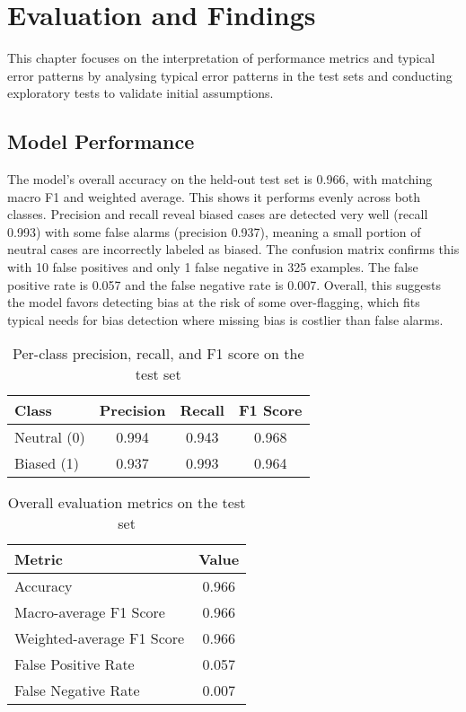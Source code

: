 \chapter{Evaluation and Findings}
    This chapter focuses on the interpretation of performance metrics and typical error patterns by analysing typical error patterns in the test sets and conducting exploratory tests to validate initial assumptions.

\section{Model Performance}
    The model’s overall accuracy on the held-out test set is 0.966, with matching macro F1 and weighted average. This shows it performs evenly across both classes. Precision and recall reveal biased cases are detected very well (recall 0.993) with some false alarms (precision 0.937), meaning a small portion of neutral cases are incorrectly labeled as biased. The confusion matrix confirms this with 10 false positives and only 1 false negative in 325 examples. The false positive rate is 0.057 and the false negative rate is 0.007. Overall, this suggests the model favors detecting bias at the risk of some over-flagging, which fits typical needs for bias detection where missing bias is costlier than false alarms.

        \vspace{0.8em}
        \begin{table}[H]
            \centering
            \begin{tabular}{lccc}
            \toprule
            \textbf{Class} & \textbf{Precision} & \textbf{Recall} & \textbf{F1 Score} \\
            \midrule
            Neutral (0) & 0.994 & 0.943 & 0.968 \\
            Biased (1)  & 0.937 & 0.993 & 0.964 \\
            \bottomrule
            \end{tabular}
            \caption{Per-class precision, recall, and F1 score on the test set}
        \end{table}

        \vspace{0.8em}
        \begin{table}[H]
            \centering
            \begin{tabular}{lc}
            \toprule
            \textbf{Metric} & \textbf{Value} \\
            \midrule
            Accuracy & 0.966 \\
            Macro-average F1 Score & 0.966 \\
            Weighted-average F1 Score & 0.966 \\
            False Positive Rate & 0.057 \\
            False Negative Rate & 0.007 \\
            \bottomrule
            \end{tabular}
            \caption{Overall evaluation metrics on the test set}
        \end{table}

